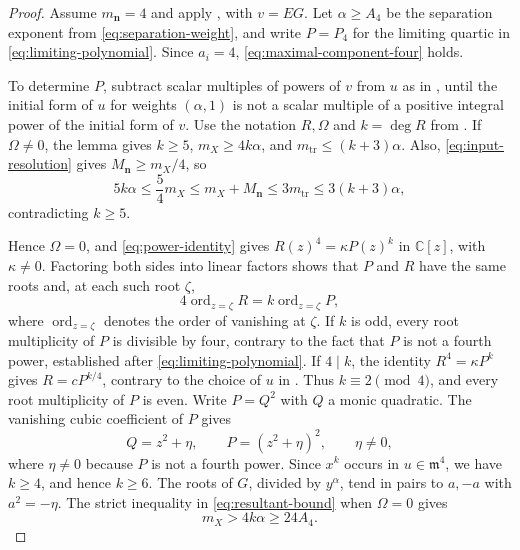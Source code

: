 \documentclass[11pt,letterpaper]{article}
\numberwithin{equation}{section}
\theoremstyle{remark}
\theoremstyle{plain}
\newcommand{\C}{\mathbb{C}}
\newcommand{\ord}{\operatorname{ord}}
\begin{document}
\begin{proof}
Assume $m_{\boldsymbol n}=4$ and apply ,
with $v=EG$.  Let $\alpha\geq A_4$ be the separation exponent
from \eqref{eq:separation-weight}, and write $P=P_4$ for the
limiting quartic in \eqref{eq:limiting-polynomial}.
Since $a_i=4$, \eqref{eq:maximal-component-four} holds.

To determine $P$, subtract scalar multiples of powers of $v$ from $u$
as in , until the initial form of $u$ for
weights $(\alpha,1)$ is not a scalar multiple of a positive integral
power of the initial form of $v$.  Use the notation $R,\Omega$ and
$k=\deg R$ from .
If $\Omega\neq0$, the lemma gives
$k\geq5$, $m_X\geq4k\alpha$, and $m_{\mathrm{tr}}\leq(k+3)\alpha$.
Also, \eqref{eq:input-resolution} gives $M_{\boldsymbol n}\geq m_X/4$, so
\[
 5k\alpha\leq\frac54m_X\leq m_X+M_{\boldsymbol n}
 \leq3m_{\mathrm{tr}}\leq3(k+3)\alpha,
\]
contradicting $k\geq5$.

Hence $\Omega=0$, and \eqref{eq:power-identity} gives
$R(z)^4=\kappa P(z)^k$ in $\C[z]$, with $\kappa\neq0$.
Factoring both sides into linear factors shows that $P$ and $R$
have the same roots and, at each such root $\zeta$,
\[
 4\ord_{z=\zeta}R=k\ord_{z=\zeta}P,
\]
where $\ord_{z=\zeta}$ denotes the order of vanishing at $\zeta$.
If $k$ is odd, every root multiplicity of $P$ is divisible by
four, contrary to the fact that $P$ is not a fourth power, established
after \eqref{eq:limiting-polynomial}.
If $4\mid k$, the identity $R^4=\kappa P^k$ gives $R=cP^{k/4}$, contrary to the
choice of $u$ in .  Thus $k\equiv2\pmod4$, and every root
multiplicity of $P$ is even.  Write $P=Q^2$ with $Q$ a monic quadratic.
The vanishing cubic coefficient of $P$ gives
\[
 Q=z^2+\eta,\qquad P=(z^2+\eta)^2,\qquad \eta\neq0,
\]
where $\eta\neq0$ because $P$ is not a fourth power.
Since $x^k$ occurs in $u\in\mathfrak m^4$, we have $k\geq4$,
and hence $k\geq6$.
The roots of $G$, divided by $y^\alpha$, tend in pairs to $a,-a$
with $a^2=-\eta$.
The strict inequality in \eqref{eq:resultant-bound} when $\Omega=0$ gives
\begin{equation}
 m_X>4k\alpha\geq24A_4.                         \label{eq:d4-contact}
\end{equation}



\end{proof}
\end{document}
